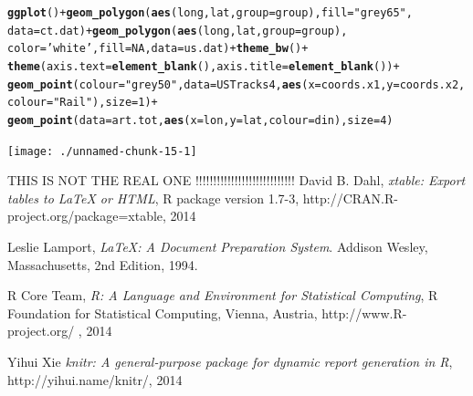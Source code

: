 \documentclass{article}\usepackage[]{graphicx}\usepackage[]{color}
\makeatletter
\newcommand{\hlnum}[1]{\textcolor[rgb]{0.686,0.059,0.569}{#1}}%
\newcommand{\hlstr}[1]{\textcolor[rgb]{0.192,0.494,0.8}{#1}}%
\newcommand{\hlopt}[1]{\textcolor[rgb]{0,0,0}{#1}}%
\newcommand{\hlstd}[1]{\textcolor[rgb]{0.345,0.345,0.345}{#1}}%
\newcommand{\hlkwc}[1]{\textcolor[rgb]{0.333,0.667,0.333}{#1}}%
\newcommand{\hlkwd}[1]{\textcolor[rgb]{0.737,0.353,0.396}{\textbf{#1}}}%
\newenvironment{kframe}{%
 \def\at@end@of@kframe{}%
 \ifinner\ifhmode%
  \def\at@end@of@kframe{\end{minipage}}%
  \begin{minipage}{\columnwidth}%
 \fi\fi%
 \def\FrameCommand##1{\hskip\@totalleftmargin \hskip-\fboxsep
 \colorbox{shadecolor}{##1}\hskip-\fboxsep
     \hskip-\linewidth \hskip-\@totalleftmargin \hskip\columnwidth}%
 \MakeFramed {\advance\hsize-\width
   \@totalleftmargin\z@ \linewidth\hsize
   \@setminipage}}%
 {\par\unskip\endMakeFramed%
 \at@end@of@kframe}
\newenvironment{knitrout}{}{} %
\makeatother
\begin{document}
\begin{knitrout}
\color{fgcolor}\begin{kframe}
\begin{alltt}
\hlkwd{ggplot}\hlstd{()} \hlopt{+} \hlkwd{geom_polygon}\hlstd{(}\hlkwd{aes}\hlstd{(long,lat,} \hlkwc{group}\hlstd{=group),} \hlkwc{fill}\hlstd{=}\hlstr{"grey65"}\hlstd{,}
  \hlkwc{data}\hlstd{=ct.dat)} \hlopt{+} \hlkwd{geom_polygon}\hlstd{(}\hlkwd{aes}\hlstd{(long,lat,} \hlkwc{group}\hlstd{=group),}
  \hlkwc{color}\hlstd{=}\hlstr{'white'}\hlstd{,} \hlkwc{fill}\hlstd{=}\hlnum{NA}\hlstd{,} \hlkwc{data}\hlstd{=us.dat)} \hlopt{+} \hlkwd{theme_bw}\hlstd{()} \hlopt{+}
  \hlkwd{theme}\hlstd{(}\hlkwc{axis.text} \hlstd{=} \hlkwd{element_blank}\hlstd{(),} \hlkwc{axis.title}\hlstd{=}\hlkwd{element_blank}\hlstd{())} \hlopt{+}
  \hlkwd{geom_point}\hlstd{(}\hlkwc{colour}\hlstd{=}\hlstr{"grey50"}\hlstd{,}\hlkwc{data}\hlstd{=USTracks4,} \hlkwd{aes}\hlstd{(}\hlkwc{x}\hlstd{=coords.x1,}\hlkwc{y}\hlstd{=coords.x2,}\hlkwc{colour}\hlstd{=}\hlstr{"Rail"}\hlstd{),} \hlkwc{size} \hlstd{=} \hlnum{1}\hlstd{)} \hlopt{+}
  \hlkwd{geom_point}\hlstd{(}\hlkwc{data}\hlstd{=art.tot,} \hlkwd{aes}\hlstd{(}\hlkwc{x}\hlstd{=lon,}\hlkwc{y}\hlstd{=lat,}\hlkwc{colour}\hlstd{=din),}\hlkwc{size} \hlstd{=} \hlnum{4}\hlstd{)}
\end{alltt}
\end{kframe}

{\centering \texttt{[image: ./unnamed-chunk-15-1]} 

}



\end{knitrout}


\begin{thebibliography}{9}

    THIS IS NOT THE REAL ONE !!!!!!!!!!!!!!!!!!!!!!!!!!!!
    David B. Dahl,
    \emph{xtable: Export tables to LaTeX or HTML},
    R package version 1.7-3,
    http://CRAN.R-project.org/package=xtable, 
    2014

  Leslie Lamport, \emph{\LaTeX: A Document Preparation System}.
  Addison Wesley, Massachusetts,
  2nd Edition, 1994.

  R Core Team, \emph{R: A Language and Environment for Statistical Computing},
  R Foundation for Statistical Computing,
  Vienna, Austria, http://www.R-project.org/ ,
  2014
  
  Yihui Xie
  \emph{knitr: A general-purpose package for dynamic report generation in R},
  http://yihui.name/knitr/, 2014  

\end{thebibliography}
\end{document}
